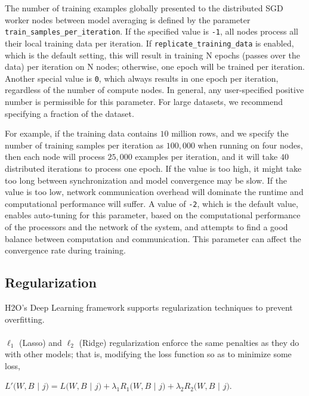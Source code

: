 The number of training examples globally presented to the distributed SGD worker nodes between model averaging is defined by the parameter \texttt{train\_samples\_per\_iteration}. If the specified value is \texttt{-1}, all nodes process all their local training data per iteration. If \texttt{replicate\_training\_data} is enabled, which is the default setting, this will result in training N epochs (passes over the data) per iteration on N nodes; otherwise, one epoch will be trained per iteration. Another special value is \texttt{0}, which always results in one epoch per iteration, regardless of the number of compute nodes. In general, any user-specified positive number is permissible for this parameter. For large datasets, we recommend specifying a fraction of the dataset. 

For example, if the training data contains $10$ million rows, and we specify the number of training samples per iteration as $100,000$ when running on four nodes, then each node will process $25,000$ examples per iteration, and it will take $40$ distributed iterations to process one epoch. If the value is too high, it might take too long between synchronization and model convergence may be slow.  If the value is too low, network communication overhead will dominate the runtime and computational performance will suffer. A value of \texttt{-2}, which is the default value, enables auto-tuning for this parameter, based on the computational performance of the processors and the network of the system, and attempts to find a good balance between computation and communication. This parameter can affect the convergence rate during training.
\\
\noindent
\subsection{Regularization} 
\label{ssec:Regularization}
H2O's Deep Learning framework supports regularization techniques to prevent overfitting. 
\\
\\
$\ell_1$ (Lasso) and $\ell_2$ (Ridge) regularization enforce the same penalties as they do with other models; that is, modifying the loss function so as to minimize some loss, %
\\
\begin{center}
$L'(W,B$ $|$ $j) = L(W,B$ $|$ $j) + \lambda_1 R_1(W,B$ $|$ $j) + \lambda_2 R_2(W,B$ $|$ $j)$.
\end{center}

